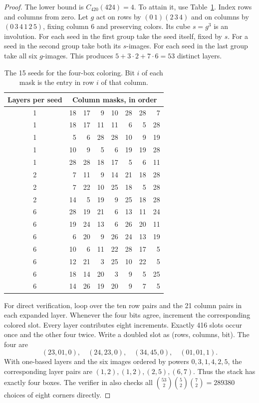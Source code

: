 \documentclass[11pt]{article}
\begin{document}
\begin{proof}
The lower bound is $C_{420}(424)=4$. To attain it, use Table~\ref{t:53}. Index rows and columns from zero. Let $g$ act on rows by $(0\,1)(2\,3\,4)$ and on columns by $(0\,3\,4\,1\,2\,5)$, fixing column 6 and preserving colors. Its cube $s=g^3$ is an involution. For each seed in the first group take the seed itself, fixed by $s$. For a seed in the second group take both its $s$-images. For each seed in the last group take all six $g$-images. This produces $5+3\cdot2+7\cdot6=53$ distinct layers.

\begin{table}[ht]\centering
\caption{The 15 seeds for the four-box coloring. Bit $i$ of each mask is the entry in row $i$ of that column.}\label{t:53}
\begin{tabular}{c@{\qquad}rrrrrrr}
\toprule
Layers per seed & \multicolumn{7}{c}{Column masks, in order}\\
\midrule
1&18&17&9&10&28&28&7\\
1&18&17&11&11&6&5&28\\
1&5&6&28&28&10&9&19\\
1&10&9&5&6&19&19&28\\
1&28&28&18&17&5&6&11\\
\midrule
2&7&11&9&14&21&18&28\\
2&7&22&10&25&18&5&28\\
2&14&5&19&9&25&18&28\\
\midrule
6&28&19&21&6&13&11&24\\
6&19&24&13&6&26&20&11\\
6&6&20&9&26&24&13&19\\
6&10&6&11&22&28&17&5\\
6&12&21&3&25&10&22&5\\
6&18&14&20&3&9&5&25\\
6&14&26&19&20&9&7&5\\
\bottomrule
\end{tabular}
\end{table}

For direct verification, loop over the ten row pairs and the 21 column pairs in each expanded layer. Whenever the four bits agree, increment the corresponding colored slot. Every layer contributes eight increments. Exactly 416 slots occur once and the other four twice. Write a doubled slot as (rows, columns, bit). The four are
\[
 (23,01,0),\quad(24,23,0),\quad(34,45,0),\quad(01,01,1).
\]
With one-based layers and the six images ordered by powers $0,3,1,4,2,5$, the corresponding layer pairs are $(1,2),(1,2),(2,5),(6,7)$. Thus the stack has exactly four boxes. The verifier in \cite{data} also checks all $\binom{53}{2}\binom52\binom72=289380$ choices of eight corners directly.
\end{proof}
\end{document}
